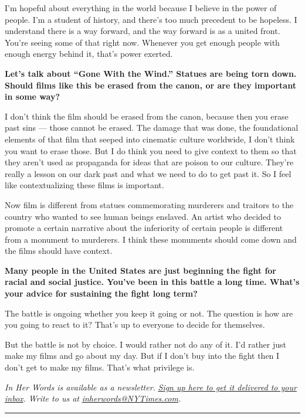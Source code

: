 I'm hopeful about everything in the world because I believe in the power
of people. I'm a student of history, and there's too much precedent to
be hopeless. I understand there is a way forward, and the way forward is
as a united front. You're seeing some of that right now. Whenever you
get enough people with enough energy behind it, that's power exerted.

\textbf{Let's talk about ``Gone With the Wind.'' Statues are being torn
down. Should films like this be erased from the canon, or are they
important in some way?}

I don't think the film should be erased from the canon, because then you
erase past sins --- those cannot be erased. The damage that was done,
the foundational elements of that film that seeped into cinematic
culture worldwide, I don't think you want to erase those. But I do think
you need to give context to them so that they aren't used as propaganda
for ideas that are poison to our culture. They're really a lesson on our
dark past and what we need to do to get past it. So I feel like
contextualizing these films is important.

Now film is different from statues commemorating murderers and traitors
to the country who wanted to see human beings enslaved. An artist who
decided to promote a certain narrative about the inferiority of certain
people is different from a monument to murderers. I think these
monuments should come down and the films should have context.

\textbf{Many people in the United States are just beginning the fight
for racial and social justice. You've been in this battle a long time.
What's your advice for sustaining the fight long term?}

The battle is ongoing whether you keep it going or not. The question is
how are you going to react to it? That's up to everyone to decide for
themselves.

But the battle is not by choice. I would rather not do any of it. I'd
rather just make my films and go about my day. But if I don't buy into
the fight then I don't get to make my films. That's what privilege is.

\emph{In Her Words is available as a newsletter.}
\href{https://www.nytimes3xbfgragh.onion/newsletters/in-her-words}{\emph{Sign
up here to get it delivered to your inbox}}\emph{. Write to us at}
\href{mailto:inherwords@NYTimes.com}{\emph{inherwords@NYTimes.com}}\emph{.}

\begin{center}\rule{0.5\linewidth}{\linethickness}\end{center}

